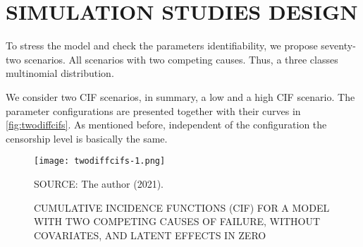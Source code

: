 \section{SIMULATION STUDIES DESIGN}
\label{cap:data}

To stress the model and check the parameters identifiability, we propose
seventy-two scenarios. All scenarios with two competing causes. Thus, a
three classes multinomial distribution.

We consider two CIF scenarios, in summary, a low and a high CIF
scenario. The parameter configurations are presented together with their
curves in \autoref{fig:twodiffcifs}. As mentioned before, independent of
the configuration the censorship level is basically the same.

\begin{figure}[H]
 \setlength{\abovecaptionskip}{.0001pt}
 \caption{CUMULATIVE INCIDENCE FUNCTIONS (CIF) FOR A MODEL WITH TWO
          COMPETING CAUSES OF FAILURE, WITHOUT COVARIATES, AND LATENT
          EFFECTS IN ZERO}
 \vspace{0.2cm}\centering
 \texttt{[image: twodiffcifs-1.png]}\\
 \begin{footnotesize}
  SOURCE: The author (2021).
 \end{footnotesize}
 \label{fig:twodiffcifs}
\end{figure}

